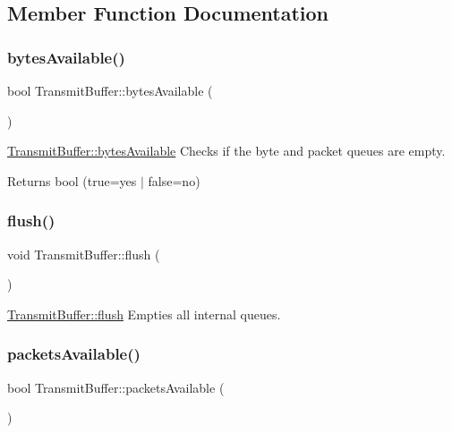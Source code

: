 \subsection{Member Function Documentation}
\hypertarget{class_transmit_buffer_aec08c2e6aa511bfd87d83ec4226b2c8e}{}\label{class_transmit_buffer_aec08c2e6aa511bfd87d83ec4226b2c8e} 
\subsubsection{\texorpdfstring{bytes\+Available()}{bytesAvailable()}}
{\footnotesize\ttfamily bool Transmit\+Buffer\+::bytes\+Available (\begin{DoxyParamCaption}{ }\end{DoxyParamCaption})}



\hyperlink{class_transmit_buffer_aec08c2e6aa511bfd87d83ec4226b2c8e}{Transmit\+Buffer\+::bytes\+Available} Checks if the byte and packet queues are empty. 

\begin{DoxyReturn}{Returns}
bool (true=yes $\vert$ false=no) 
\end{DoxyReturn}
\hypertarget{class_transmit_buffer_a574f5ab5eca07b5ee8a517812cd7d87a}{}\label{class_transmit_buffer_a574f5ab5eca07b5ee8a517812cd7d87a} 
\subsubsection{\texorpdfstring{flush()}{flush()}}
{\footnotesize\ttfamily void Transmit\+Buffer\+::flush (\begin{DoxyParamCaption}{ }\end{DoxyParamCaption})}



\hyperlink{class_transmit_buffer_a574f5ab5eca07b5ee8a517812cd7d87a}{Transmit\+Buffer\+::flush} Empties all internal queues. 

\hypertarget{class_transmit_buffer_aad9976b2ae40b1405a319de979b09827}{}\label{class_transmit_buffer_aad9976b2ae40b1405a319de979b09827} 
\subsubsection{\texorpdfstring{packets\+Available()}{packetsAvailable()}}
{\footnotesize\ttfamily bool Transmit\+Buffer\+::packets\+Available (\begin{DoxyParamCaption}{ }\end{DoxyParamCaption})}



